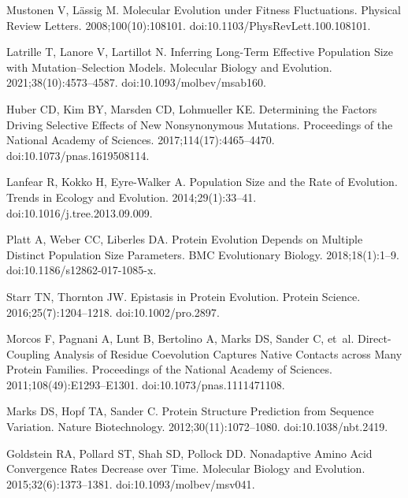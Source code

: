 \documentclass[10pt,letterpaper]{article}
\begin{document}
\begin{thebibliography}{10}
Mustonen V, L{\"a}ssig M.
\newblock Molecular {{Evolution}} under {{Fitness Fluctuations}}.
\newblock Physical Review Letters. 2008;100(10):108101.
\newblock doi:{10.1103/PhysRevLett.100.108101}.

Latrille T, Lanore V, Lartillot N.
\newblock Inferring Long-Term Effective Population Size with
Mutation--Selection Models.
\newblock Molecular Biology and Evolution. 2021;38(10):4573--4587.
\newblock doi:{10.1093/molbev/msab160}.

Huber CD, Kim BY, Marsden CD, Lohmueller KE.
\newblock Determining the Factors Driving Selective Effects of New
Nonsynonymous Mutations.
\newblock Proceedings of the National Academy of Sciences.
2017;114(17):4465--4470.
\newblock doi:{10.1073/pnas.1619508114}.

Lanfear R, Kokko H, {Eyre-Walker} A.
\newblock Population Size and the Rate of Evolution.
\newblock Trends in Ecology and Evolution. 2014;29(1):33--41.
\newblock doi:{10.1016/j.tree.2013.09.009}.

Platt A, Weber CC, Liberles DA.
\newblock Protein Evolution Depends on Multiple Distinct Population Size
Parameters.
\newblock BMC Evolutionary Biology. 2018;18(1):1--9.
\newblock doi:{10.1186/s12862-017-1085-x}.

Starr TN, Thornton JW.
\newblock Epistasis in Protein Evolution.
\newblock Protein Science. 2016;25(7):1204--1218.
\newblock doi:{10.1002/pro.2897}.

Morcos F, Pagnani A, Lunt B, Bertolino A, Marks DS, Sander C, et~al.
\newblock Direct-Coupling Analysis of Residue Coevolution Captures Native
Contacts across Many Protein Families.
\newblock Proceedings of the National Academy of Sciences.
2011;108(49):E1293--E1301.
\newblock doi:{10.1073/pnas.1111471108}.

Marks DS, Hopf TA, Sander C.
\newblock Protein Structure Prediction from Sequence Variation.
\newblock Nature Biotechnology. 2012;30(11):1072--1080.
\newblock doi:{10.1038/nbt.2419}.

Goldstein RA, Pollard ST, Shah SD, Pollock DD.
\newblock Nonadaptive {{Amino Acid Convergence Rates Decrease}} over {{Time}}.
\newblock Molecular Biology and Evolution. 2015;32(6):1373--1381.
\newblock doi:{10.1093/molbev/msv041}.


\end{thebibliography}
\end{document}
